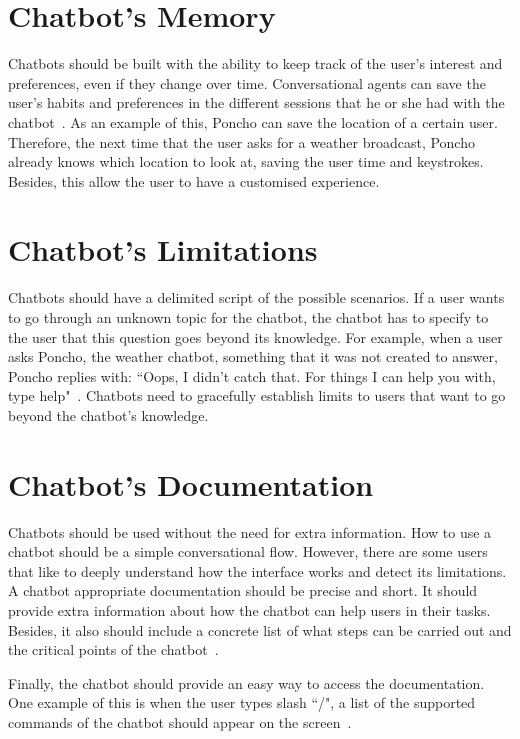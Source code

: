 \documentclass[a4paper,10pt]{article}
\begin{document}
\section{Chatbot's Memory}

Chatbots should be built with the ability to keep track of the user's interest and preferences, even if they change over time. Conversational agents can save the user's habits and preferences in the different sessions that he or she had with the chatbot~\cite{shneiderman1997direct}. As an example of this, Poncho can save the location of a certain user. Therefore, the next time that the user asks for a weather broadcast, Poncho already knows which location to look at, saving the user time and keystrokes. Besides, this allow the user to have a customised experience. 


\section{Chatbot's Limitations}

Chatbots should have a delimited script of the possible scenarios. If a user wants to go through an unknown topic for the chatbot, the chatbot has to specify to the user that this question goes beyond its knowledge. For example, when a user asks Poncho, the weather chatbot, something that it was not created to answer, Poncho replies with: ``Oops, I didn't catch that. For things I can help you with, type help"~\cite{HeuristicsWebPage}. Chatbots need to gracefully establish limits to users that want to go beyond the chatbot's knowledge.  

\section{Chatbot's Documentation}

Chatbots should be used without the need for extra information. How to use a chatbot should be a simple conversational flow. However, there are some users that like to deeply understand how the interface works and detect its limitations. A chatbot appropriate documentation should be precise and short. It should provide extra information about how the chatbot can help users in their tasks. Besides, it also should include a concrete list of what steps can be carried out and the critical points of the chatbot~\cite{HeuristicsWebPage}. 

Finally, the chatbot should provide an easy way to access the documentation. One example of this is when the user types slash ``/", a list of the supported commands of the chatbot should appear on the screen~\cite{botfather}.  


\medskip


\end{document}
